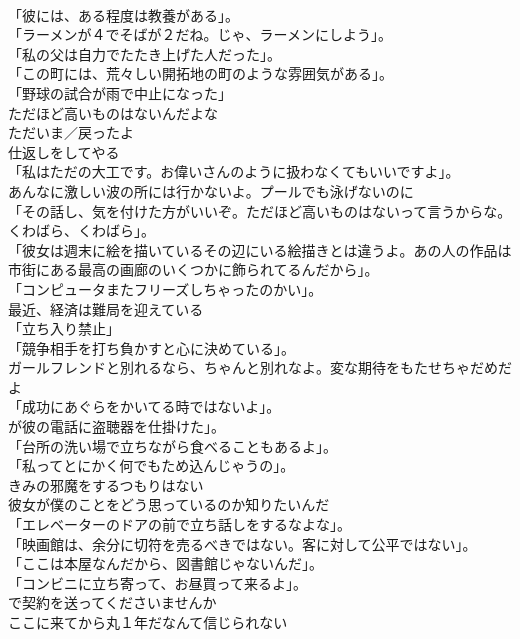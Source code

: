 \documentclass[8pt]{extreport}
\begin{document}
\begin{CJK}{UTF8}{min}
\\	「彼には、ある程度は教養がある」。	
\\	「ラーメンが４でそばが２だね。じゃ、ラーメンにしよう」。	
\\	「私の父は自力でたたき上げた人だった」。	
\\	「この町には、荒々しい開拓地の町のような雰囲気がある」。	
\\	「野球の試合が雨で中止になった」	
\\	ただほど高いものはないんだよな	
\\	ただいま／戻ったよ	
\\	仕返しをしてやる	
\\	「私はただの大工です。お偉いさんのように扱わなくてもいいですよ」。	
\\	あんなに激しい波の所には行かないよ。プールでも泳げないのに	
\\	「その話し、気を付けた方がいいぞ。ただほど高いものはないって言うからな。くわばら、くわばら」。	
\\	「彼女は週末に絵を描いているその辺にいる絵描きとは違うよ。あの人の作品は市街にある最高の画廊のいくつかに飾られてるんだから」。	
\\	「コンピュータまたフリーズしちゃったのかい」。	
\\	最近、経済は難局を迎えている	
\\	「立ち入り禁止」	
\\	「競争相手を打ち負かすと心に決めている」。	
\\	ガールフレンドと別れるなら、ちゃんと別れなよ。変な期待をもたせちゃだめだよ	
\\	「成功にあぐらをかいてる時ではないよ」。	
\\	が彼の電話に盗聴器を仕掛けた」。	
\\	「台所の洗い場で立ちながら食べることもあるよ」。	
\\	「私ってとにかく何でもため込んじゃうの」。	
\\	きみの邪魔をするつもりはない	
\\	彼女が僕のことをどう思っているのか知りたいんだ	
\\	「エレベーターのドアの前で立ち話しをするなよな」。	
\\	「映画館は、余分に切符を売るべきではない。客に対して公平ではない」。	
\\	「ここは本屋なんだから、図書館じゃないんだ」。	
\\	「コンビニに立ち寄って、お昼買って来るよ」。	
\\	で契約を送ってくださいませんか	
\\	ここに来てから丸１年だなんて信じられない	

\end{CJK}
\end{document}
